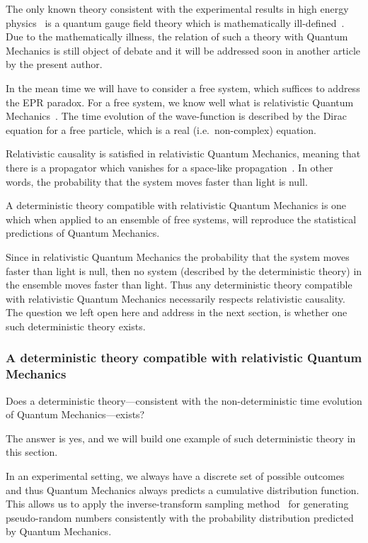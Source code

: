 \documentclass[11pt]{book}
\begin{document}
The only known theory consistent with the experimental results in high
energy physics~\cite{Olive2014Review} is a quantum gauge field theory which is mathematically
ill-defined~\cite{Jaffe2006Quantum}. Due to the mathematically illness, the relation of such a theory
with Quantum Mechanics is still object of debate and it will be
addressed soon in another article by the present author.

In the mean time we will have to consider a free system, which suffices
to address the EPR paradox. For a free system, we know well what is
relativistic Quantum
Mechanics~\cite{Pedro2013On}.
The time evolution of the wave-function is described by the Dirac
equation for a free particle, which is a real (i.e.~non-complex)
equation.

Relativistic causality is satisfied in relativistic Quantum Mechanics,
meaning that there is a propagator which vanishes for a space-like
propagation~\cite{Pedro2013On}.
In other words, the probability that the system moves faster than light
is null.

A deterministic theory compatible with relativistic Quantum Mechanics is
one which when applied to an ensemble of free systems, will reproduce
the statistical predictions of Quantum Mechanics.

Since in relativistic Quantum Mechanics the probability that the system
moves faster than light is null, then no system (described by the
deterministic theory) in the ensemble moves faster than light. Thus any
deterministic theory compatible with relativistic Quantum Mechanics
necessarily respects relativistic causality. The question we left open
here and address in the next section, is whether one such deterministic
theory exists.

\hypertarget{a-deterministic-theory-compatible-with-relativistic-quantum-mechanics}{%
\subsubsection{A deterministic theory compatible with relativistic
Quantum
Mechanics}\label{a-deterministic-theory-compatible-with-relativistic-quantum-mechanics}}

Does a deterministic theory---consistent with the non-deterministic time
evolution of Quantum Mechanics---exists?

The answer is yes, and we will build one example of such deterministic
theory in this section.

In an experimental setting, we always have a discrete set of possible
outcomes and thus Quantum Mechanics always predicts a cumulative
distribution function. This allows us to apply the inverse-transform
sampling
method~\cite{Rubinstein2016Simulation} for generating pseudo-random numbers consistently with
the probability distribution predicted by Quantum Mechanics.
\end{document}
